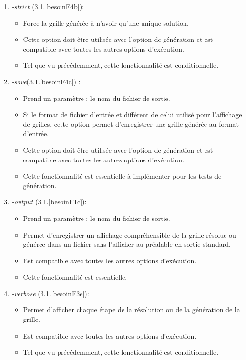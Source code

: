 \documentclass[12pt]{article}
\begin{document}
\begin{enumerate}
\begin{enumerate}
\item \textit{-strict} (3.1.\ref{besoinF4b}):
\begin{itemize}
\item Force la grille générée à n'avoir qu'une unique solution.
\item Cette option doit être utilisée avec l'option de génération et est compatible avec toutes les autres options d'exécution.
\item Tel que vu précédemment, cette fonctionnalité est conditionnelle.\\
\end{itemize}

\item \textit{-save}(3.1.\ref{besoinF4c}) :
\begin{itemize}
\item Prend un paramètre : le nom du fichier de sortie.
\item Si le format de fichier d'entrée et différent de celui utilisé pour l'affichage de grilles, cette option permet d'enregistrer une grille générée au format d'entrée.
\item Cette option doit être utilisée avec l'option de génération et est compatible avec toutes les autres options d'exécution.
\item Cette fonctionnalité est essentielle à implémenter pour les tests de génération.\\
\end{itemize}

\item \textit{-output} (3.1.\ref{besoinF1c}):
\begin{itemize}
\item Prend un paramètre : le nom du fichier de sortie.
\item Permet d'enregistrer un affichage compréhensible de la grille résolue ou générée dans un fichier sans l'afficher au préalable en sortie standard.
\item Est compatible avec toutes les autres options d'exécution.
\item Cette fonctionnalité est essentielle.\\
\end{itemize}

\item \label {besoinNF5f}\textit{-verbose} (3.1.\ref{besoinF3e}):
\begin{itemize}
\item Permet d'afficher chaque étape de la résolution ou de la génération de la grille.
\item Est compatible avec toutes les autres options d'exécution.
\item Tel que vu précédemment, cette fonctionnalité est conditionnelle.\\
\end{itemize}


\end{enumerate}
\end{enumerate}
\end{document}

